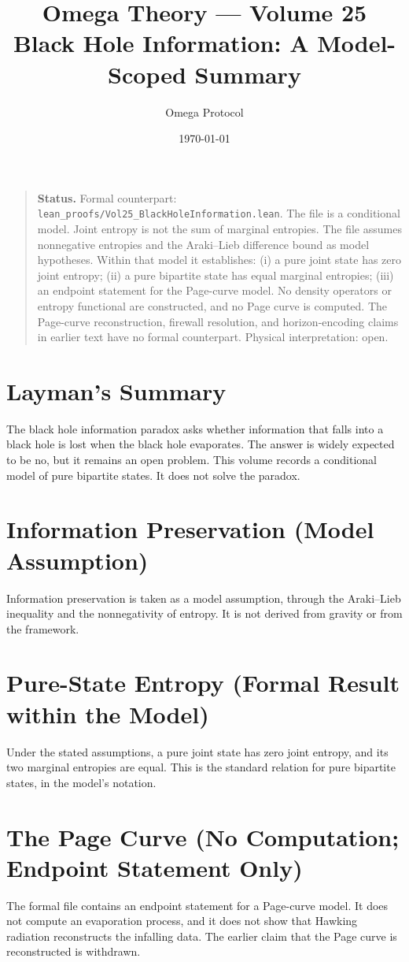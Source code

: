 \documentclass[11pt, a4paper]{article}
\title{Omega Theory --- Volume 25\\\Large Black Hole Information: A Model-Scoped Summary}
\author{Omega Protocol}
\date{\today}
\begin{document}
\maketitle

\begin{quote}
\textbf{Status.} Formal counterpart: \texttt{lean\_proofs/Vol25\_BlackHoleInformation.lean}. The file is a conditional model. Joint entropy is not the sum of marginal entropies. The file assumes nonnegative entropies and the Araki--Lieb difference bound as model hypotheses. Within that model it establishes: (i) a pure joint state has zero joint entropy; (ii) a pure bipartite state has equal marginal entropies; (iii) an endpoint statement for the Page-curve model. No density operators or entropy functional are constructed, and no Page curve is computed. The Page-curve reconstruction, firewall resolution, and horizon-encoding claims in earlier text have no formal counterpart. Physical interpretation: open.
\end{quote}

\section*{Layman's Summary}
The black hole information paradox asks whether information that falls into a black hole is lost when the black hole evaporates. The answer is widely expected to be no, but it remains an open problem. This volume records a conditional model of pure bipartite states. It does not solve the paradox.

\section{Information Preservation (Model Assumption)}
Information preservation is taken as a model assumption, through the Araki--Lieb inequality and the nonnegativity of entropy. It is not derived from gravity or from the framework.

\section{Pure-State Entropy (Formal Result within the Model)}
Under the stated assumptions, a pure joint state has zero joint entropy, and its two marginal entropies are equal. This is the standard relation for pure bipartite states, in the model's notation.

\section{The Page Curve (No Computation; Endpoint Statement Only)}
The formal file contains an endpoint statement for a Page-curve model. It does not compute an evaporation process, and it does not show that Hawking radiation reconstructs the infalling data. The earlier claim that the Page curve is reconstructed is withdrawn.
\end{document}
